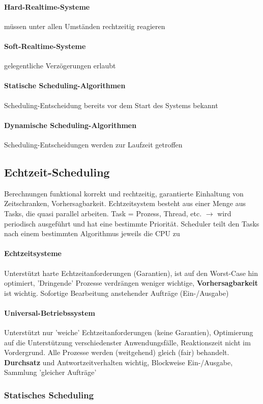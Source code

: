 \documentclass[11pt,a4paper,landscape]{article}
\begin{document}
\begin{multicols*}{3}
	\paragraph{Hard-Realtime-Systeme} müssen unter allen Umständen rechtzeitig reagieren
	\paragraph{Soft-Realtime-Systeme} gelegentliche Verzögerungen erlaubt
	\paragraph{Statische Scheduling-Algorithmen} Scheduling-Entscheidung bereits vor dem Start des Systems bekannt
	\paragraph{Dynamische Scheduling-Algorithmen} Scheduling-Entscheidungen werden zur Laufzeit getroffen
	\subsection{Echtzeit-Scheduling}
	Berechnungen funktional korrekt und rechtzeitig, garantierte Einhaltung von Zeitschranken, Vorhersagbarkeit. Echtzeitsystem besteht aus einer Menge aus Tasks, die quasi parallel arbeiten. Task = Prozess, Thread, etc. $\rightarrow$ wird periodisch ausgeführt und hat eine bestimmte Priorität. Scheduler teilt den Tasks nach einem bestimmten Algorithmus jeweils die CPU zu
	\paragraph{Echtzeitsysteme} Unterstützt harte Echtzeitanforderungen (Garantien), ist auf den Worst-Case hin optimiert, 'Dringende' Prozesse verdrängen weniger wichtige, \textbf{Vorhersagbarkeit} ist wichtig. Sofortige Bearbeitung anstehender Aufträge (Ein-/Ausgabe)
	\paragraph{Universal-Betriebssystem} Unterstützt nur 'weiche' Echtzeitanforderungen (keine Garantien), Optimierung auf die Unterstützung verschiedenster Anwendungsfälle, Reaktionszeit nicht im Vordergrund. Alle Prozesse werden (weitgehend) gleich (fair) behandelt. \textbf{Durchsatz} und Antwortzeitverhalten wichtig, Blockweise Ein-/Ausgabe, Sammlung 'gleicher Aufträge'
	\subsubsection{Statisches Scheduling}

\end{multicols*}
\end{document}
